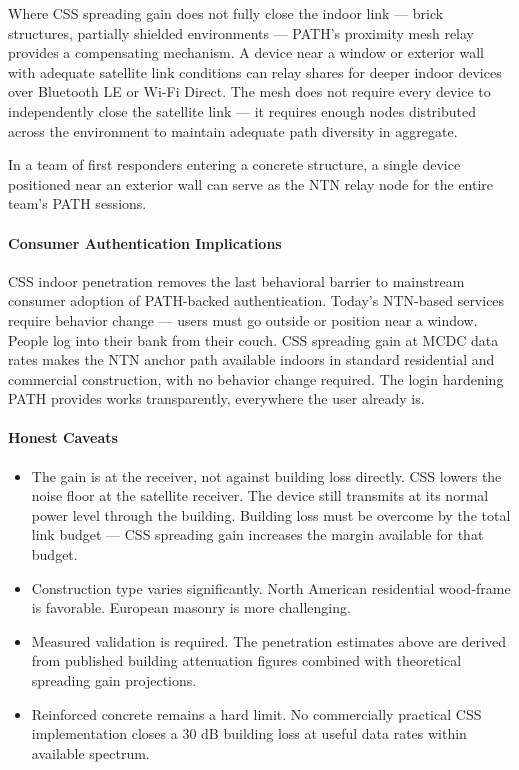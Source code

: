 \documentclass[
  11pt,
]{article}
\providecommand{\tightlist}{%
  \setlength{\itemsep}{0pt}\setlength{\parskip}{0pt}}
\begin{document}
Where CSS spreading gain does not fully close the indoor link --- brick
structures, partially shielded environments --- PATH's proximity mesh
relay provides a compensating mechanism. A device near a window or
exterior wall with adequate satellite link conditions can relay shares
for deeper indoor devices over Bluetooth LE or Wi-Fi Direct. The mesh
does not require every device to independently close the satellite link
--- it requires enough nodes distributed across the environment to
maintain adequate path diversity in aggregate.

In a team of first responders entering a concrete structure, a single
device positioned near an exterior wall can serve as the NTN relay node
for the entire team's PATH sessions.

\hypertarget{consumer-authentication-implications}{%
\paragraph{Consumer Authentication
Implications}\label{consumer-authentication-implications}}

CSS indoor penetration removes the last behavioral barrier to mainstream
consumer adoption of PATH-backed authentication. Today's NTN-based
services require behavior change --- users must go outside or position
near a window. People log into their bank from their couch. CSS
spreading gain at MCDC data rates makes the NTN anchor path available
indoors in standard residential and commercial construction, with no
behavior change required. The login hardening PATH provides works
transparently, everywhere the user already is.

\hypertarget{honest-caveats}{%
\paragraph{Honest Caveats}\label{honest-caveats}}

\begin{itemize}
\tightlist
\item
  The gain is at the receiver, not against building loss directly. CSS
  lowers the noise floor at the satellite receiver. The device still
  transmits at its normal power level through the building. Building
  loss must be overcome by the total link budget --- CSS spreading gain
  increases the margin available for that budget.
\item
  Construction type varies significantly. North American residential
  wood-frame is favorable. European masonry is more challenging.
\item
  Measured validation is required. The penetration estimates above are
  derived from published building attenuation figures combined with
  theoretical spreading gain projections.
\item
  Reinforced concrete remains a hard limit. No commercially practical
  CSS implementation closes a 30 dB building loss at useful data rates
  within available spectrum.
\end{itemize}
\end{document}
